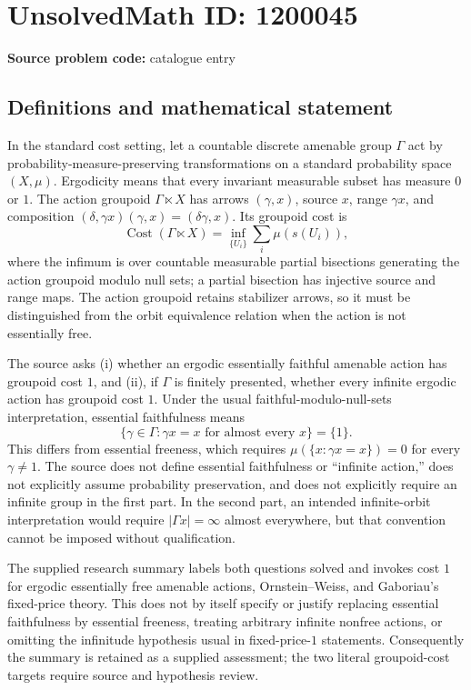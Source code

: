 \documentclass[11pt]{article}
\begin{document}
\section*{UnsolvedMath ID: 1200045}
\textbf{Source problem code:} catalogue entry
\subsection{Definitions and mathematical statement}
In the standard cost setting, let a countable discrete amenable group \(\Gamma\) act by probability-measure-preserving transformations on a standard probability space \((X,\mu)\). Ergodicity means that every invariant measurable subset has measure \(0\) or \(1\). The action groupoid \(\Gamma\ltimes X\) has arrows \((\gamma,x)\), source \(x\), range \(\gamma x\), and composition \((\delta,\gamma x)(\gamma,x)=(\delta\gamma,x)\). Its groupoid cost is
\[
\operatorname{Cost}(\Gamma\ltimes X)
=\inf_{\{U_i\}}\sum_i\mu(s(U_i)),
\]
where the infimum is over countable measurable partial bisections generating the action groupoid modulo null sets; a partial bisection has injective source and range maps. The action groupoid retains stabilizer arrows, so it must be distinguished from the orbit equivalence relation when the action is not essentially free.

The source asks (i) whether an ergodic essentially faithful amenable action has groupoid cost \(1\), and (ii), if \(\Gamma\) is finitely presented, whether every infinite ergodic action has groupoid cost \(1\). Under the usual faithful-modulo-null-sets interpretation, essential faithfulness means
\[
\{\gamma\in\Gamma:\gamma x=x\text{ for almost every }x\}=\{1\}.
\]
This differs from essential freeness, which requires \(\mu(\{x:\gamma x=x\})=0\) for every \(\gamma\ne1\). The source does not define essential faithfulness or ``infinite action,'' does not explicitly assume probability preservation, and does not explicitly require an infinite group in the first part. In the second part, an intended infinite-orbit interpretation would require \(|\Gamma x|=\infty\) almost everywhere, but that convention cannot be imposed without qualification.

The supplied research summary labels both questions solved and invokes cost \(1\) for ergodic essentially free amenable actions, Ornstein--Weiss, and Gaboriau's fixed-price theory. This does not by itself specify or justify replacing essential faithfulness by essential freeness, treating arbitrary infinite nonfree actions, or omitting the infinitude hypothesis usual in fixed-price-\(1\) statements. Consequently the summary is retained as a supplied assessment; the two literal groupoid-cost targets require source and hypothesis review.
\end{document}
